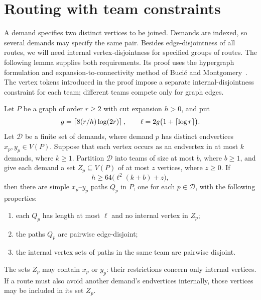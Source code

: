 \section{Routing with team constraints}
\label{sec:routing}

A demand specifies two distinct vertices to be joined.  Demands are indexed,
so several demands may specify the same pair.  Besides edge-disjointness of
all routes, we will need internal vertex-disjointness for specified groups
of routes.  The following lemma supplies both requirements.  Its proof uses
the hypergraph formulation and expansion-to-connectivity method of
Buci\'c and Montgomery~\cite[Proposition~8 and Lemma~9]{BM2024}.
The vertex tokens introduced in the proof impose a separate
internal-disjointness constraint for each team; different teams
compete only for graph edges.

\begin{lemma}[Routing]\label{lem:routing}
Let $P$ be a graph of order $r\ge 2$ with cut expansion $h>0$, and put
\begin{equation}\label{eq:routing-radii}
  g=\left\lceil8(r/h)\log(2r)\right\rceil,\qquad
  \ell=2g\bigl(1+\left\lceil\log r\right\rceil\bigr).
\end{equation}
Let $\mathcal D$ be a finite set of demands, where demand $p$ has distinct
endvertices $x_p,y_p\in V(P)$.  Suppose that each vertex occurs as an
endvertex in at most $k$ demands, where $k\ge 1$.  Partition $\mathcal D$
into teams of size at most $b$, where $b\ge 1$, and give each demand a set
$Z_p\subseteq V(P)$ of at most $z$ vertices, where $z\ge 0$.
If
\begin{equation}\label{eq:routing-condition}
  h\ge 64\bigl(\ell^2(k+b)+z\bigr),
\end{equation}
then there are simple $x_p$--$y_p$ paths $Q_p$ in $P$, one for each
$p\in\mathcal D$, with the following properties:
\begin{enumerate}[label=\textup{(\roman*)}]
  \item each $Q_p$ has length at most $\ell$ and no internal vertex in $Z_p$;
  \item the paths $Q_p$ are pairwise edge-disjoint;
  \item the internal vertex sets of paths in the same team are pairwise
    disjoint.
\end{enumerate}
The sets $Z_p$ may contain $x_p$ or $y_p$: their restrictions concern only
internal vertices.  If a route must also avoid another demand's endvertices
internally, those vertices may be included in its set $Z_p$.
\end{lemma}

